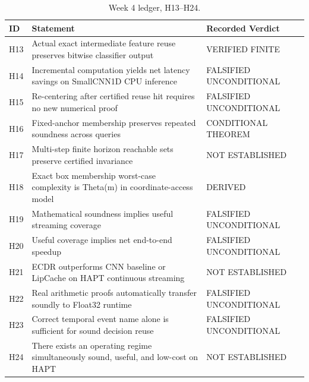 \begin{table}[H]
\caption{Week 4 ledger, H13--H24.}
\centering\small
\begin{tabularx}{\textwidth}{@{}lYY@{}}\toprule
ID & Statement & Recorded Verdict \\
\midrule
H13 & Actual exact intermediate feature reuse preserves bitwise classifier output & VERIFIED FINITE \\
H14 & Incremental computation yields net latency savings on SmallCNN1D CPU inference & FALSIFIED UNCONDITIONAL \\
H15 & Re-centering after certified reuse hit requires no new numerical proof & FALSIFIED UNCONDITIONAL \\
H16 & Fixed-anchor membership preserves repeated soundness across queries & CONDITIONAL THEOREM \\
H17 & Multi-step finite horizon reachable sets preserve certified invariance & NOT ESTABLISHED \\
H18 & Exact box membership worst-case complexity is Theta(m) in coordinate-access model & DERIVED \\
H19 & Mathematical soundness implies useful streaming coverage & FALSIFIED UNCONDITIONAL \\
H20 & Useful coverage implies net end-to-end speedup & FALSIFIED UNCONDITIONAL \\
H21 & ECDR outperforms CNN baseline or LipCache on HAPT continuous streaming & NOT ESTABLISHED \\
H22 & Real arithmetic proofs automatically transfer soundly to Float32 runtime & FALSIFIED UNCONDITIONAL \\
H23 & Correct temporal event name alone is sufficient for sound decision reuse & FALSIFIED UNCONDITIONAL \\
H24 & There exists an operating regime simultaneously sound, useful, and low-cost on HAPT & NOT ESTABLISHED \\
\bottomrule\end{tabularx}
\end{table}

